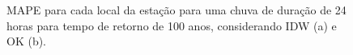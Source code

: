 \documentclass[
]{agujournal2019}
\begin{document}
\begin{figure}

\begin{minipage}{\linewidth}



\end{minipage}%
\newline
\begin{minipage}{\linewidth}



\end{minipage}%

\caption{\label{fig-Figura29}MAPE para cada local da estação para uma
chuva de duração de 24 horas para tempo de retorno de 100 anos,
considerando IDW (a) e OK (b).}

\end{figure}%
\end{document}
